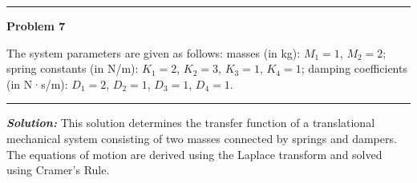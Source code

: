 \documentclass[11pt]{article}
\newcommand{\hspring}[2]{%
      \draw[spring] (#1) -- ++(2,0) node[midway, above=0.25cm]{#2};
    }
\newcommand{\hdamper}[2]{%
      \begin{scope}[shift={#1}]
        \draw (0,0) -- (0.5,0);                  %
        \draw (0.5,0) -- (0.5,0.3) -- (1.5,0.3);  %
        \draw (0.5,0) -- (0.5,-0.3) -- (1.5,-0.3);%
        
        \draw (1.0,0) -- (1.0,0.15);
        \draw (1.0,0) -- (1.0,-0.15);
        
        \draw (1.0,0) -- (2.0,0);
    
        \node[above] at (1,0.3) {#2};
      \end{scope}
    }
\newcommand{\tbody}[4]{
    \node[tbody] (#4) at (#1) {#2};
    \node at ([yshift=20mm]#4.center) {#3};
    \draw ([yshift=11mm]#4.center) -- ([yshift=18mm]#4.center);
    \draw[->] ([yshift=16mm, xshift=-4mm]#4.center) -- ([yshift=16mm, xshift=5mm]#4.center);
    }
\begin{document}
\newpage
  \setcounter{page}{2}  
\noindent\rule{\textwidth}{1pt}
\noindent\textbf{Problem 7} \hfill 
\begin{center}
\end{center}

\noindent The system parameters are given as follows: masses (in kg): \( M_1 = 1 \), \( M_2 = 2 \); spring constants (in N/m): \( K_1 = 2 \), \( K_2 = 3 \), \( K_3 = 1 \), \( K_4 = 1 \); damping coefficients (in N·s/m): \( D_1 = 2 \), \( D_2 = 1 \), \( D_3 = 1 \), \( D_4 = 1 \).

\noindent\rule{\textwidth}{1pt}

\vspace{12pt}

\noindent \textbf{\textit{Solution:}}
This solution determines the transfer function of a translational mechanical system consisting of two masses connected by springs and dampers. The equations of motion are derived using the Laplace transform and solved using Cramer's Rule.
\end{document}
